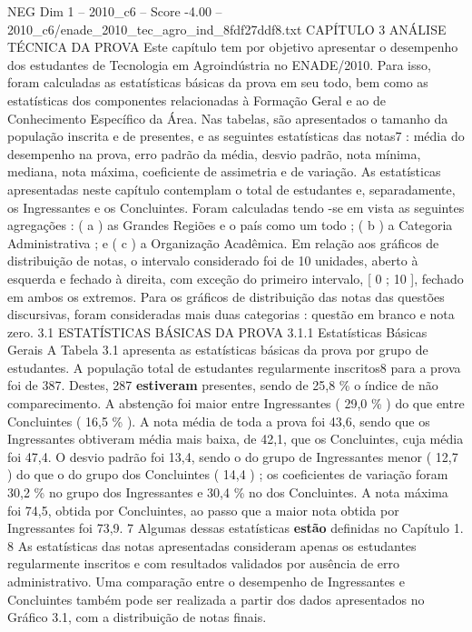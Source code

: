 \begin{textsample}{NEG Dim 1 – 2010\_c6 – Score -4.00 – 2010\_c6/enade\_2010\_tec\_agro\_ind\_8fdf27ddf8.txt}  \label{ex:f1_neg_271}
CAPÍTULO 3 ANÁLISE TÉCNICA DA PROVA Este capítulo tem por objetivo apresentar o desempenho dos estudantes de Tecnologia em Agroindústria no ENADE/2010.
Para isso, foram calculadas as estatísticas básicas da prova em seu todo, bem como as estatísticas dos componentes relacionadas à Formação Geral e ao de Conhecimento Específico da Área.
Nas tabelas, são apresentados o tamanho da população inscrita e de presentes, e as seguintes estatísticas das notas7 : média do desempenho na prova, erro padrão da média, desvio padrão, nota mínima, mediana, nota máxima, coeficiente de assimetria e de variação.
As estatísticas apresentadas neste capítulo contemplam o total de estudantes e, separadamente, os Ingressantes e os Concluintes.
Foram calculadas tendo -se em vista as seguintes agregações : ( a ) as Grandes Regiões e o país como um todo ; ( b ) a Categoria Administrativa ; e ( c ) a Organização Acadêmica.
Em relação aos gráficos de distribuição de notas, o intervalo considerado foi de 10 unidades, aberto à esquerda e fechado à direita, com exceção do primeiro intervalo, [ 0 ; 10 ], fechado em ambos os extremos.
Para os gráficos de distribuição das notas das questões discursivas, foram consideradas mais duas categorias : questão em branco e nota zero. 3.1 ESTATÍSTICAS BÁSICAS DA PROVA 3.1.1 Estatísticas Básicas Gerais A Tabela 3.1 apresenta as estatísticas básicas da prova por grupo de estudantes.
A população total de estudantes regularmente inscritos8 para a prova foi de 387.
Destes, 287 \textbf{estiveram} presentes, sendo de 25,8 \% o índice de não comparecimento.
A abstenção foi maior entre Ingressantes ( 29,0 \% ) do que entre Concluintes ( 16,5 \% ).
A nota média de toda a prova foi 43,6, sendo que os Ingressantes obtiveram média mais baixa, de 42,1, que os Concluintes, cuja média foi 47,4.
O desvio padrão foi 13,4, sendo o do grupo de Ingressantes menor ( 12,7 ) do que o do grupo dos Concluintes ( 14,4 ) ; os coeficientes de variação foram 30,2 \% no grupo dos Ingressantes e 30,4 \% no dos Concluintes.
A nota máxima foi 74,5, obtida por Concluintes, ao passo que a maior nota obtida por Ingressantes foi 73,9. 7 Algumas dessas estatísticas \textbf{estão} definidas no Capítulo 1. 8 As estatísticas das notas apresentadas consideram apenas os estudantes regularmente inscritos e com resultados validados por ausência de erro administrativo.
Uma comparação entre o desempenho de Ingressantes e Concluintes também pode ser realizada a partir dos dados apresentados no Gráfico 3.1, com a distribuição de notas finais.

\end{textsample}
